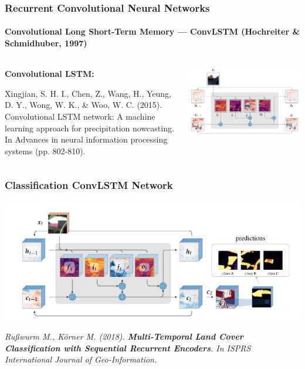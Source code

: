 \begin{frame}[t]
\frametitle{Recurrent Convolutional Neural Networks}
\framesubtitle{Convolutional Long Short-Term Memory --- ConvLSTM (Hochreiter \& Schmidhuber, 1997)}
\begin{columns}
	\begin{column}{0.3\textwidth}
		
		
		\textbf{Convolutional LSTM:}
		
		\vspace{2em}
		{\scriptsize
			Xingjian, S. H. I., Chen, Z., Wang, H., Yeung, D. Y., Wong, W. K., \& Woo, W. C. (2015). Convolutional LSTM network: A machine learning approach for precipitation nowcasting. In Advances in neural information processing systems (pp. 802-810). \par
		}
		
	\end{column}
	\vspace{-2em}	
	\begin{column}{0.7\textwidth}
		
		\includegraphics[width=\textwidth]{images/convlstm}	
	\end{column}
\end{columns}



\end{frame}

\begin{frame}
\frametitle{Classification ConvLSTM Network}

\centering\includegraphics[width=.8\textwidth]{images/lstm}

\vspace{2em}
	\small\raggedright
\textsl{
	Rußwurm M., Körner M. (2018). \textbf{Multi-Temporal Land Cover Classification with Sequential Recurrent Encoders}. In ISPRS International Journal of Geo-Information. 
}

\end{frame}


